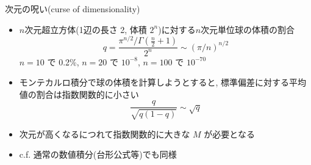 \begin{frame}[t,fragile]{次元の呪い(curse of dimensionality)}
  \begin{itemize}
  \item $n$次元超立方体(1辺の長さ 2, 体積 $2^n$)に対する$n$次元単位球の体積の割合
    \[
    q = \frac{\pi^{n/2} / \Gamma(\frac{n}{2}+1)}{2^n} \sim (\pi/n)^{n/2}
    \]
    $n=10$ で 0.2\%, $n=20$ で $10^{-8}$, $n=100$ で $10^{-70}$
  \item モンテカルロ積分で球の体積を計算しようとすると, 標準偏差に対する平均値の割合は指数関数的に小さい
    \[
    \frac{q}{\sqrt{q(1-q)}} \sim \sqrt{q}
    \]
  \item 次元が高くなるにつれて指数関数的に大きな $M$ が必要となる
  \item c.f. 通常の数値積分(台形公式等)でも同様
  \end{itemize}
\end{frame}
